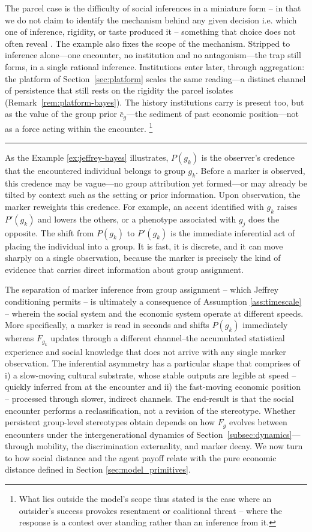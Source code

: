 \documentclass[pdflatex,sn-basic]{sn-jnl}
\theoremstyle{thmstyleone}
\numberwithin{proposition}{subsection}
\begin{document}
The parcel case is the difficulty of social inferences in a miniature form -- in that we do not claim to
identify the mechanism behind any given decision i.e. which one of inference,
rigidity, or taste produced it -- something that choice does not often reveal
\citep{Sen1973}. The example also fixes the scope of the mechanism. Stripped to
inference alone---one encounter, no institution and no antagonism---the
trap still forms, in a single rational inference. Institutions enter
later, through aggregation: the platform of Section~\ref{sec:platform}
scales the same reading---a distinct channel of persistence that still
rests on the rigidity the parcel isolates
(Remark~\ref{rem:platform-bayes}). The history institutions carry is
present too, but as the value of the group prior $\bar{c}_g$---the
sediment of past economic position---not as a force acting within the
encounter. \footnote{What lies outside the model's scope thus stated is the case where an outsider's
success provokes resentment or coalitional threat -- where the response is
a contest over standing rather than an inference from it.} 

\rule{15cm}{0.4pt}   

As the Example \ref{ex:jeffrey-bayes} illustrates, $P(g_k)$ is the observer's credence that the encountered individual
belongs to group $g_k$. Before a marker is observed, this credence
may be vague---no group attribution yet formed---or may already be
tilted by context such as the setting or prior information. Upon
observation, the marker reweights this credence. For example, an accent
identified with $g_k$ raises $P'(g_k)$ and lowers the others, or a
phenotype associated with $g_j$ does the opposite. The shift from
$P(g_k)$ to $P'(g_k)$ is the immediate inferential act of placing
the individual into a group. It is fast, it is discrete, and it can
move sharply on a single observation, because the marker is
precisely the kind of evidence that carries direct information
about group assignment. 


The separation of marker inference from group assignment -- which Jeffrey conditioning permits -- is ultimately a consequence of Assumption \ref{ass:timescale} -- wherein the social system and the economic system operate at different
speeds. More specifically, a marker is read in seconds and shifts $P(g_k)$ immediately whereas 
$F_{g_k}$ updates through a different channel--the accumulated
statistical experience and social knowledge that does not arrive
with any single marker observation. The inferential asymmetry has a
particular shape that comprises of i) a slow-moving cultural substrate, whose stable
outputs are legible at speed -- quickly inferred from at the
encounter and ii) the fast-moving economic position -- processed
through slower, indirect channels. The end-result is that the social encounter performs a reclassification, not a
revision of the stereotype. Whether persistent group-level
stereotypes obtain depends on how $F_g$ evolves between encounters
under the intergenerational dynamics of
Section~\ref{subsec:dynamics}---through mobility, the discrimination
externality, and marker decay. We now turn to how social distance and the agent payoff relate with the pure economic distance defined in Section \ref{sec:model_primitives}.
\end{document}
